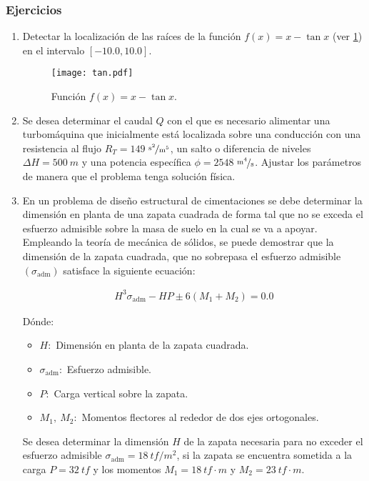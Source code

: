 \subsubsection{Ejercicios}
\begin{enumerate}

\item \label{ejer:raices-tan} Detectar la localización de las raíces de la función $f(x) = x - \tan x$ (ver \cref{fig:tan}) en el intervalo $[-10.0,10.0]$.
\begin{figure}[h]
\centering
\texttt{[image: tan.pdf]}
\caption{Función $f(x) = x - \tan x$.}
\label{fig:tan}
\end{figure}

\item \label{ejer:raices-turbo} Se desea determinar el caudal $Q$ con el que es necesario alimentar una turbomáquina que inicialmente está localizada sobre una conducción con una resistencia al flujo ${R_T} = 149$ $\nicefrac{\unit{s}^2}{\unit{m}^5} $, un salto o diferencia de niveles $\Delta H = 500\ \unit{m}$ y una potencia específica $\phi = 2548$ $\nicefrac{\unit{m}^4}{\unit{s}}$. Ajustar los parámetros de manera que el problema tenga solución física.

\item \label{ejer:raices-zapata} En un problema de diseño estructural de cimentaciones se debe determinar la dimensión en planta de una zapata cuadrada de forma tal que no se exceda el esfuerzo admisible sobre la masa de suelo en la cual se va a apoyar. Empleando la teoría de mecánica de sólidos, se puede demostrar que la dimensión de la zapata cuadrada, que no sobrepasa el esfuerzo admisible $(\sigma_\text{adm})$ satisface la siguiente ecuación:

\begin{align}
	H^3 \sigma_\text{adm} - H P \pm 6 (M_1 + M_2) = 0.0
\end{align}

Dónde:

\begin{itemize}
	\item $H:$ Dimensión en planta de la zapata cuadrada.
	\item $\sigma_\text{adm}:$ Esfuerzo admisible.
	\item $P:$ Carga vertical sobre la zapata.
	\item $M_1, \ M_2:$ Momentos flectores al rededor de dos ejes ortogonales.
\end{itemize}

Se desea determinar la dimensión $H$ de la zapata necesaria para no exceder el esfuerzo admisible $\sigma_\text{adm}= 18 \ \unit{tf}/\unit{m}^2$, si la zapata se encuentra sometida a la carga $P=32 \ \unit{tf}$ y los momentos $M_1= 18 \ \unit{tf}\cdot\unit{m}$ y $M_2= 23 \ \unit{tf}\cdot\unit{m}$.

\end{enumerate}